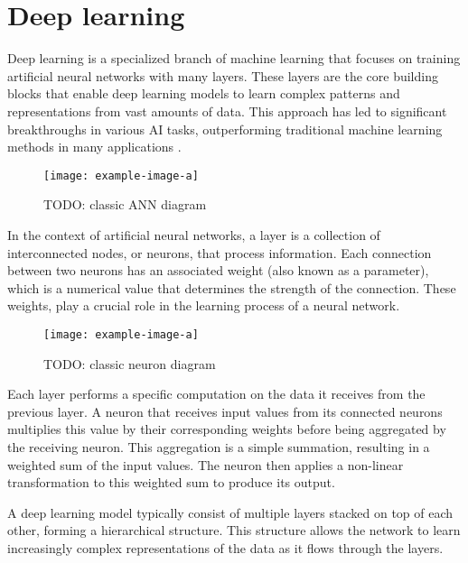 \section{Deep learning}
Deep learning is a specialized branch of machine learning that focuses on training artificial neural networks with many layers.
These layers are the core building blocks that enable deep learning models to learn complex patterns and representations from vast amounts of data.
This approach has led to significant breakthroughs in various AI tasks, outperforming traditional machine learning methods in many applications \cite{}.

\begin{figure}[hbtp]
    \centering    
    \texttt{[image: example-image-a]}
    \caption{TODO: classic ANN diagram}
\end{figure}

In the context of artificial neural networks, a layer is a collection of interconnected nodes, or neurons, that process information.
Each connection between two neurons has an associated weight (also known as a parameter), which is a numerical value that determines the strength of the connection.
These weights, play a crucial role in the learning process of a neural network.

\begin{figure}[hbtp]
    \centering    
    \texttt{[image: example-image-a]}
    \caption{TODO: classic neuron diagram}
\end{figure}

Each layer performs a specific computation on the data it receives from the previous layer.
A neuron that receives input values from its connected neurons multiplies this value by their corresponding weights before being aggregated by the receiving neuron.
This aggregation is a simple summation, resulting in a weighted sum of the input values.
The neuron then applies a non-linear transformation to this weighted sum to produce its output.

A deep learning model typically consist of multiple layers stacked on top of each other, forming a hierarchical structure.
This structure allows the network to learn increasingly complex representations of the data as it flows through the layers.

